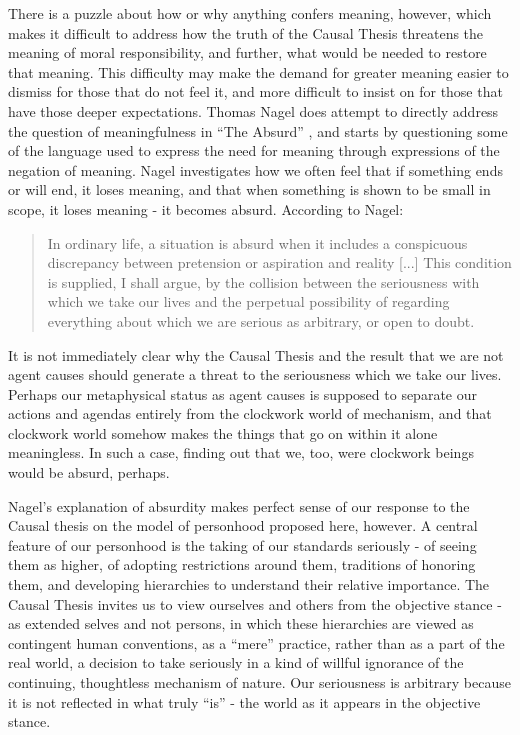 \documentclass[phd,12pt,oneside,paper=letterpaper]{ubcthesis}
\begin{document}
There is a puzzle about how or why anything confers meaning, however, which makes it difficult to address how the truth of the Causal Thesis threatens the meaning of moral responsibility, and further, what would be needed to restore that meaning. This difficulty may make the demand for greater meaning easier to dismiss for those that do not feel it, and more difficult to insist on for those that have those deeper expectations. Thomas Nagel does attempt to directly address the question of meaningfulness in ``The Absurd'' \citep{nagel1979}, and starts by questioning some of the language used to express the need for meaning through expressions of the negation of meaning. Nagel investigates how we often feel that if something ends or will end, it loses meaning, and that when something is shown to be small in scope, it loses meaning - it becomes absurd. According to Nagel:
\begin{quote}
In ordinary life, a situation is absurd when it includes a conspicuous discrepancy between pretension or aspiration and reality [...] This condition is supplied, I shall argue, by the collision between the seriousness with which we take our lives and the perpetual possibility of regarding everything about which we are serious as arbitrary, or open to doubt.  \citep{nagel1979}
\end{quote}
It is not immediately clear why the Causal Thesis and the result that we are not agent causes should generate a threat to the seriousness which we take our lives. Perhaps our metaphysical status as agent causes is supposed to separate our actions and agendas entirely from the clockwork world of mechanism, and that clockwork world somehow makes the things that go on within it alone meaningless. In such a case, finding out that we, too, were clockwork beings would be absurd, perhaps. 

Nagel's explanation of absurdity makes perfect sense of our response to the Causal thesis on the model of personhood proposed here, however. A central feature of our personhood is the taking of our standards seriously - of seeing them as higher, of adopting restrictions around them, traditions of honoring them, and developing hierarchies to understand their relative importance. The Causal Thesis invites us to view ourselves and others from the objective stance - as extended selves and not persons, in which these hierarchies are viewed as contingent human conventions, as a ``mere'' practice, rather than as a part of the real world, a decision to take seriously in a kind of willful ignorance of the continuing, thoughtless mechanism of nature. Our seriousness is arbitrary because it is not reflected in what truly ``is'' - the world as it appears in the objective stance. 
\end{document}
